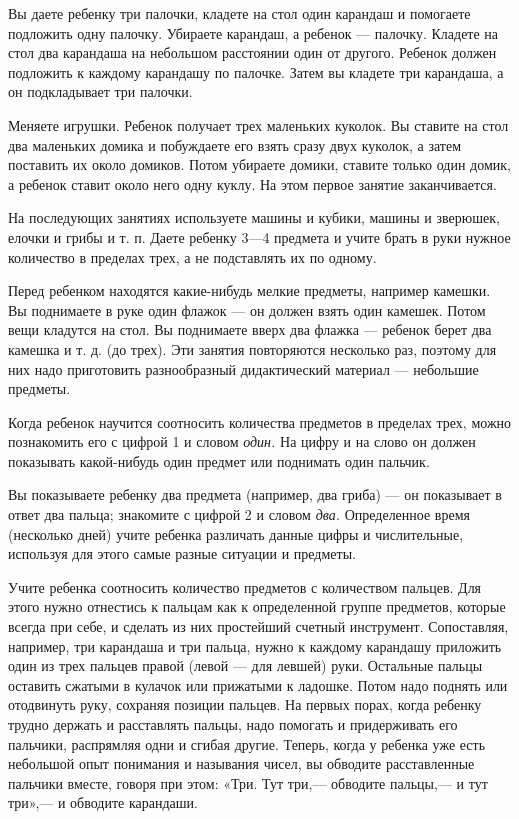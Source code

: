 \documentclass[a5paper]{book}
\renewcommand{\emph}[1]{\textit{#1}}
\begin{document}
Вы даете ребенку три палочки, кладете на стол один карандаш и помогаете
подложить одну палочку. Убираете карандаш, а ребенок --- палочку.
Кладете на стол два карандаша на небольшом расстоянии один от другого.
Ребенок должен подложить к каждому карандашу по палочке. Затем вы
кладете три карандаша, а он подкладывает три палочки.

Меняете игрушки. Ребенок получает трех маленьких куколок. Вы ставите на
стол два маленьких домика и побуждаете его взять сразу двух куколок, а
затем поставить их около домиков. Потом убираете домики, ставите только
один домик, а ребенок ставит около него одну куклу. На этом первое
занятие заканчивается.

На последующих занятиях используете машины и кубики, машины и зверюшек,
елочки и грибы и т. п. Даете ребенку 3---4 предмета и учите брать в руки
нужное количество в пределах трех, а не подставлять их по одному.

Перед ребенком находятся какие-нибудь мелкие предметы, например камешки.
Вы поднимаете в руке один флажок --- он должен взять один камешек. Потом
вещи кладутся на стол. Вы поднимаете вверх два флажка --- ребенок берет
два камешка и т. д. (до трех). Эти занятия повторяются несколько раз,
поэтому для них надо приготовить разнообразный дидактический материал
--- небольшие предметы.

Когда ребенок научится соотносить количества предметов в пределах трех,
можно познакомить его с цифрой 1 и словом \emph{один.} На цифру и на
слово он должен показывать какой-нибудь один предмет или поднимать один
пальчик.

Вы показываете ребенку два предмета (например, два гриба) --- он
показывает в ответ два пальца; знакомите с цифрой 2 и словом \emph{два.}
Определенное время (несколько дней) учите ребенка различать данные цифры
и числительные, используя для этого самые разные ситуации и предметы.

Учите ребенка соотносить количество предметов с количеством пальцев. Для
этого нужно отнестись к пальцам как к определенной группе предметов,
которые всегда при себе, и сделать из них простейший счетный инструмент.
Сопоставляя, например, три карандаша и три пальца, нужно к каждому
карандашу приложить один из трех пальцев правой (левой --- для левшей)
руки. Остальные пальцы оставить сжатыми в кулачок или прижатыми к
ладошке. Потом надо поднять или отодвинуть руку, сохраняя позиции
пальцев. На первых порах, когда ребенку трудно держать и расставлять
пальцы, надо помогать и придерживать его пальчики, распрямляя одни и
сгибая другие. Теперь, когда у ребенка уже есть небольшой опыт понимания
и называния чисел, вы обводите расставленные пальчики вместе, говоря при
этом: «Три. Тут три,--- обводите пальцы,--- и тут три»,--- и обводите
карандаши.
\end{document}
